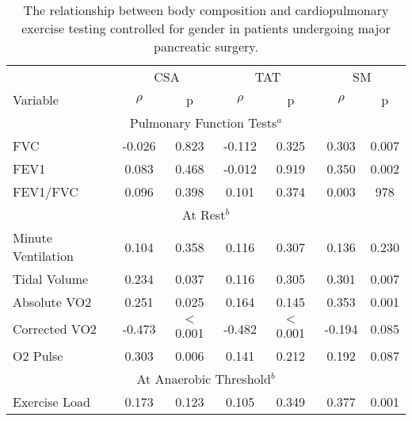 \begin{table}[p]
	\caption{The relationship between body composition and cardiopulmonary exercise testing controlled for gender in patients undergoing major pancreatic surgery.}
	\label{table:bc_cpet}
	\centering
	\renewcommand{\arraystretch}{1.4} %
	\setlength{\tabcolsep}{9pt} %
	\begin{tabular}{|l | c c | c c | c c|}
		\hline
		                   & \multicolumn{2}{|c|}{CSA} & \multicolumn{2}{|c|}{TAT} & \multicolumn{2}{|c|}{SM}      \\
		Variable           & $\rho$ & p                & $\rho$ & p                & $\rho$ & p                    \\ \hline
		\multicolumn{7}{|c|}{Pulmonary Function Tests$^a$}                                                         \\ \hline
		FVC                & -0.026 & 0.823            & -0.112 & 0.325            & 0.303  & 0.007                \\
		FEV1               & 0.083  & 0.468            & -0.012 & 0.919            & 0.350  & 0.002                \\
		FEV1/FVC           & 0.096  & 0.398            & 0.101  & 0.374            & 0.003  & 978                  \\ \hline
		\multicolumn{7}{|c|}{At Rest$^b$}                                                                          \\ \hline
		Minute Ventilation & 0.104  & 0.358            & 0.116  & 0.307            & 0.136  & 0.230                \\
		Tidal Volume       & 0.234  & 0.037            & 0.116  & 0.305            & 0.301  & 0.007                \\
		Absolute VO2       & 0.251  & 0.025            & 0.164  & 0.145            & 0.353  & 0.001                \\
		Corrected VO2      & -0.473 & $<$0.001         & -0.482 & $<$0.001         & -0.194 & 0.085                \\
		O2 Pulse           & 0.303  & 0.006            & 0.141  & 0.212            & 0.192  & 0.087                \\ \hline
		\multicolumn{7}{|c|}{At Anaerobic Threshold$^b$}                                                           \\ \hline
		Exercise Load      & 0.173  & 0.123            & 0.105  & 0.349            & 0.377  & 0.001                \\

\end{tabular}
\end{table}
